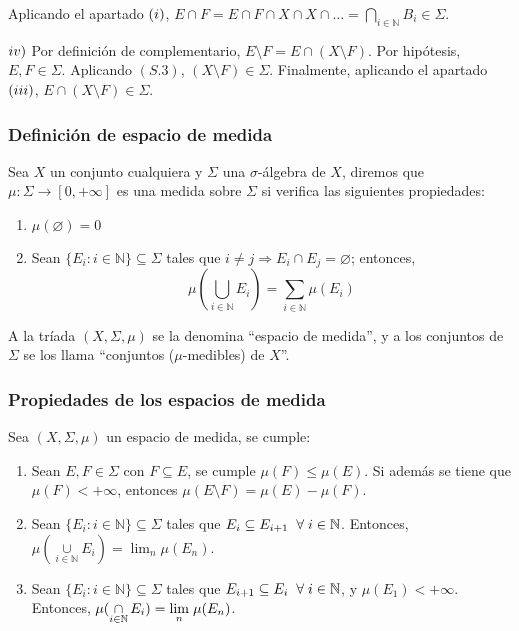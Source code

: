 \documentclass[12pt,a4paper]{article}
\newcommand{\N}{\mathbb{N}}
\newcommand{\smallcup}{\mathop{\cup}\limits}
\newcommand{\smallcap}{\mathop{\cap}\limits}
\newcommand{\mlim}[1]{\displaystyle{\lim_{#1}}}
\newcounter{unit}[section]
\newcounter{chapter}[unit]
\renewcommand{\theunit}{\arabic{unit}}
\renewcommand{\thechapter}{\arabic{chapter}}
\renewcommand{\thesubsubsection}{\theunit.\thechapter.\arabic{subsubsection}}
\newcommand{\result}[1]{%
  \subsubsection{#1}%
  \label{result:\thesubsubsection}
}
\begin{document}
\vspace{2mm} \noindent
Aplicando el apartado $(\romannumeral 1)$, $E \cap F = E \cap F \cap X \cap X \cap \ldots
= \displaystyle{\bigcap_{i \in \N}{B_i}} \in \Sigma$.

\vspace{4mm}
$\romannumeral 4)$ Por definición de complementario, $E\setminus F = E \cap (X \setminus F)$.
Por hipótesis, $E,F\in \Sigma$. Aplicando $(S.3)$, $(X\setminus F)\in \Sigma$.
Finalmente, aplicando el apartado $(\romannumeral 3)$, $E \cap (X \setminus F) \in \Sigma$.

\vspace{6mm}
\result{Definición de espacio de medida}
\hspace{3mm} Sea $X$ un conjunto cualquiera y $\Sigma$ una $\sigma$-álgebra de $X$, diremos que
$\mu : \Sigma \longrightarrow [0,+\infty]$ es una medida sobre $\Sigma$ si verifica las siguientes propiedades:
\begin{enumerate}[label=M.\arabic*)]
    \item $\mu(\varnothing) = 0$
    \item Sean $\{E_i : i\in \N\} \subseteq \Sigma$ tales que $i \neq j \Rightarrow E_i \cap E_j = \varnothing $; entonces,
    $$\mu\left(\bigcup_{i\in \N} E_i\right) = \sum_{i\in \N} \mu(E_i)$$
\end{enumerate}

\vspace{2mm}
A la tríada $(X, \Sigma, \mu)$ se la denomina ``espacio de medida'', y a los conjuntos
de $\Sigma$ se los llama ``conjuntos ($\mu$-medibles) de $X$''.

\result{Propiedades de los espacios de medida}
\hspace{3mm} Sea $(X,\Sigma,\mu)$ un espacio de medida, se cumple:
\begin{enumerate}[label=\roman*)]
    \item Sean $E,F\in \Sigma$ con $F \subseteq E$, se cumple $\mu(F) \leq \mu(E)$.
    \newline \noindent
    Si además se tiene que $\mu(F) < +\infty$, entonces $\mu(E \setminus F) = \mu(E) - \mu(F)$.
    
    \item Sean $\{E_i : i \in \N\} \subseteq \Sigma$ tales que $E_i \subseteq E_{i+1} \hspace{2mm}\forall \hspace{1mm} i \in \N$.
    \newline\noindent
    Entonces, $\mu (\smallcup_{i \in \N}{E_i}) = \displaystyle{\lim_n \mu(E_n)}$.
    
    \item Sean $\{E_i : i \in \N\} \subseteq \Sigma$ tales que $E_{i+1} \subseteq E_{i} \hspace{2mm}\forall \hspace{1mm} i \in \N$, y $\mu(E_1) < +\infty$.
    \newline \noindent
    Entonces, $\mu(\smallcap_{i\in\N}E_i) = \mlim{n} \hspace{1mm} \mu(E_n)$.
\end{enumerate}
\end{document}
